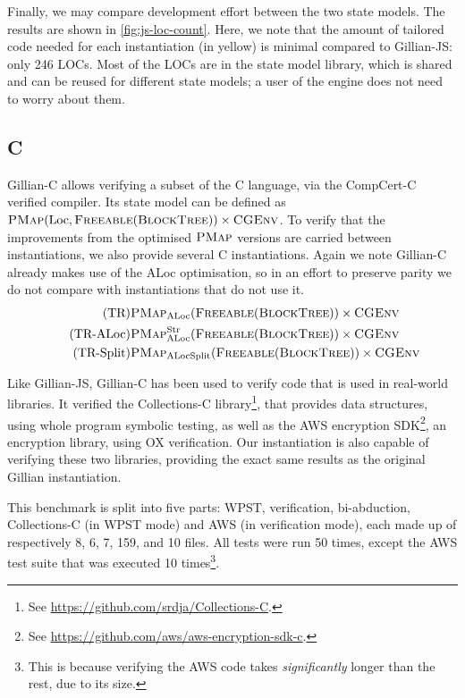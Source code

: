 Finally, we may compare development effort between the two state models. The results are shown in \autoref{fig:js-loc-count}. Here, we note that the amount of tailored code needed for each instantiation (in yellow) is minimal compared to Gillian-JS: only 246 LOCs. Most of the LOCs are in the state model library, which is shared and can be reused for different state models; a user of the engine does not need to worry about them.

\subsection{C}

Gillian-C allows verifying a subset of the C language, via the CompCert-C verified compiler. Its state model can be defined as ${\textsc{PMap}(\text{Loc},\textsc{Freeable}(\textsc{BlockTree})) \times \textsc{CGEnv}}$. To verify that the improvements from the optimised $\textsc{PMap}$ versions are carried between instantiations, we also provide several C instantiations. Again we note Gillian-C already makes use of the ALoc optimisation, so in an effort to preserve parity we do not compare with instantiations that do not use it.
\begin{align}
\tag{TR}       & \textsc{PMap}_{\text{ALoc}}(\textsc{Freeable}(\textsc{BlockTree})) \times \textsc{CGEnv} \\
\tag{TR-ALoc}  & \textsc{PMap}_{\text{ALoc}}^{\text{Str}}(\textsc{Freeable}(\textsc{BlockTree})) \times \textsc{CGEnv} \\
\tag{TR-Split} & \textsc{PMap}_{\text{ALocSplit}}(\textsc{Freeable}(\textsc{BlockTree})) \times \textsc{CGEnv}
\end{align}

Like Gillian-JS, Gillian-C has been used to verify code that is used in real-world libraries. It verified the Collections-C library\footnote{See \url{https://github.com/srdja/Collections-C}.}, that provides data structures, using whole program symbolic testing, as well as the AWS encryption SDK\footnote{See \url{https://github.com/aws/aws-encryption-sdk-c}.}, an encryption library, using OX verification. Our instantiation is also capable of verifying these two libraries, providing the exact same results as the original Gillian instantiation.

This benchmark is split into five parts: WPST, verification, bi-abduction, \mbox{Collections-C} (in WPST mode) and AWS (in verification mode), each made up of respectively 8, 6, 7, 159, and 10 files. All tests were run 50 times, except the AWS test suite that was executed 10 times\footnote{This is because verifying the AWS code takes \emph{significantly} longer than the rest, due to its size.}.


